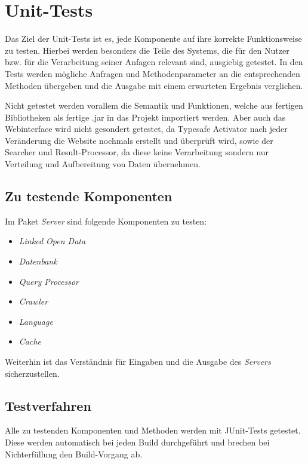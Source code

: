 
\chapter{Unit-Tests}

Das Ziel der Unit-Tests ist es, jede Komponente auf ihre korrekte Funktionsweise
zu testen. Hierbei werden besonders die Teile des Systems, die
für den Nutzer bzw. für die Verarbeitung seiner Anfagen relevant sind,
ausgiebig getestet. In den Tests werden mögliche Anfragen und Methodenparameter
an die entsprechenden Methoden übergeben und die Ausgabe mit einem erwarteten
Ergebnis verglichen. 

Nicht getestet werden vorallem die Semantik und Funktionen,
welche aus fertigen Bibliotheken als fertige .jar in das Projekt importiert
werden.
Aber auch das Webinterface wird nicht gesondert getestet, da Typesafe Activator
nach jeder Veränderung die Website nochmals erstellt und überprüft wird, sowie der Searcher
und Result-Processor, da diese keine Verarbeitung sondern nur Verteilung und
Aufbereitung von Daten übernehmen.

\section{Zu testende Komponenten}

Im Paket \textit{Server} sind folgende Komponenten zu testen:
\begin{itemize}
\item \textit{Linked Open Data}
\item \textit{Datenbank}
\item \textit{Query Processor}
\item \textit{Crawler}
\item \textit{Language}
\item \textit{Cache}
\end{itemize}

Weiterhin ist das Verständnis für Eingaben und die Ausgabe des
\textit{Servers} sicherzustellen.

\section{Testverfahren}

Alle zu testenden Komponenten und Methoden werden mit JUnit-Tests getestet.
Diese werden automatisch bei jeden Build durchgeführt und brechen bei
Nichterfüllung den Build-Vorgang ab.

